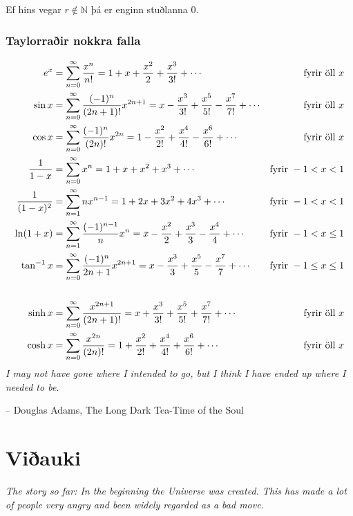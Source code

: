 \documentclass[a4paper,10pt,icelandic]{sphinxmanual}
\begin{document}
Ef hins vegar \(r\notin {{\mathbb  N}}\) þá er enginn stuðlanna 0.


\subsection{Taylorraðir nokkra falla}
\label{kafli10:taylorrair-nokkra-falla}\begin{gather}
\begin{split}\begin{aligned}
e^x&=\sum_{n=0}^\infty\frac{x^n}{n!}
    =1+x+\frac{x^2}{2}+\frac{x^3}{3!}
    +\cdots
  &\mbox{fyrir öll }x\\
\sin x&=  \sum_{n=0}^\infty\frac{(-1)^n}{(2n+1)!}x^{2n+1}
    =x-\frac{x^3}{3!}+\frac{x^5}{5!}-\frac{x^7}{7!}+\cdots
    &\mbox{fyrir öll }x\\
\cos x&=  \sum_{n=0}^\infty\frac{(-1)^n}{(2n)!}x^{2n}
    =1-\frac{x^2}{2!}+\frac{x^4}{4!}-\frac{x^6}{6!}+\cdots
    &\mbox{fyrir öll }x\\
\frac{1}{1-x}&=\sum_{n=0}^\infty x^n
    =1+x+x^2+x^3+\cdots
&\mbox{fyrir }-1<x<1\\
\frac{1}{(1-x)^2}&=\sum_{n=1}^\infty nx^{n-1}
    =1+2x+3x^2+4x^3+\cdots
&\mbox{fyrir }-1<x<1\\
\ln(1+x)&=  \sum_{n=1}^\infty\frac{(-1)^{n-1}}{n}x^n
    =x-\frac{x^2}{2}+\frac{x^3}{3}-\frac{x^4}{4}+\cdots
    &\mbox{fyrir }-1<x\leq 1\\
\tan^{-1} x&=  \sum_{n=0}^\infty\frac{(-1)^n}{2n+1}x^{2n+1}
    =x-\frac{x^3}{3}+\frac{x^5}{5}-\frac{x^7}{7}+\cdots
    &\mbox{fyrir }-1\leq x\leq 1\\\\
\sinh x&=  \sum_{n=0}^\infty\frac{x^{2n+1}}{(2n+1)!}
    =x+\frac{x^3}{3!}+\frac{x^5}{5!}+\frac{x^7}{7!}+\cdots
    &\mbox{fyrir öll } x\\
\cosh x&=  \sum_{n=0}^\infty\frac{x^{2n}}{(2n)!}
    =1+\frac{x^2}{2!}+\frac{x^4}{4!}+\frac{x^6}{6!}+\cdots
    &\mbox{fyrir öll } x\\\end{aligned}\end{split}\notag
\end{gather}
\emph{I may not have gone where I intended to go, but I think I have ended up where I needed to be.}

-- Douglas Adams, The Long Dark Tea-Time of the Soul


\chapter{Viðauki}
\label{vidauki::doc}\label{vidauki:viauki}
\emph{The story so far:
In the beginning the Universe was created.
This has made a lot of people very angry and been widely regarded as a bad move.}
\end{document}
